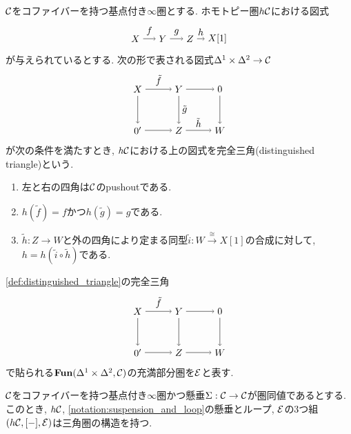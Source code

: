 \documentclass[uplatex, a4paper, 14Q, dvipdfmx]{jsarticle}
\begin{document}
\begin{definition}[完全三角] \label{def:distinguished_triangle}
  $\mathcal{C}$をコファイバーを持つ基点付き$\infty$圏とする.
  ホモトピー圏$h\mathcal{C}$における図式
  \[
    \begin{tikzpicture}[auto,->]
      \node (X) at (0,0) {$X$};
      \node (Y) at (1,0) {$Y$};
      \node (Z) at (2,0) {$Z$};
      \node (X[1]) at (3,0) {$X[1]$};
      \draw (X) -- node {$f$} (Y);
      \draw (Y) -- node {$g$} (Z);
      \draw (Z) -- node {$h$} (X[1]);
    \end{tikzpicture}
  \]
  が与えられているとする.
  次の形で表される図式$\Delta^1 \times \Delta^2 \to \mathcal{C}$
  \[
    \begin{tikzpicture}[auto,->]
      \node (0') at (0,0) {$0'$};
      \node (Z) at (1.5,0) {$Z$};
      \node (W) at (3,0) {$W$};
      \node (X) at (0,1.5) {$X$};
      \node (Y) at (1.5,1.5) {$Y$};
      \node (0) at (3.0,1.5) {$0$};
      \draw (X) -- node {$\tilde{f}$} (Y);
      \draw (Y) -- node {$\tilde{g}$} (Z);
      \draw (Z) -- node {$\tilde{h}$} (W);
      \draw (Y) -- (0);
      \draw (X) -- (0');
      \draw (0') -- (Z);
      \draw (0) -- (W);
    \end{tikzpicture}
  \]
  が次の条件を満たすとき, $h\mathcal{C}$における上の図式を完全三角(distinguished triangle)という. 
  \begin{enumerate}
    \item 左と右の四角は$\mathcal{C}$のpushoutである. 
    \item $h(\tilde{f}) = f$かつ$h(\tilde{g}) = g$である.
    \item $\tilde{h} : Z \to W$と外の四角により定まる同型$\tilde{i} :W \xrightarrow{\cong} X[1]$の合成に対して, $h = h(\tilde{i} \circ \tilde{h})$である. 
  \end{enumerate}
\end{definition}

\cref{def:distinguished_triangle}の完全三角
\[
  \begin{tikzpicture}[auto,->]
    \node (0') at (0,0) {$0'$};
    \node (Z) at (1.5,0) {$Z$};
    \node (W) at (3,0) {$W$};
    \node (X) at (0,1.5) {$X$};
    \node (Y) at (1.5,1.5) {$Y$};
    \node (0) at (3.0,1.5) {$0$};
    \draw (X) -- node {$\tilde{f}$} (Y);
    \draw (Y) -- (Z);
    \draw (Z) -- (W);
    \draw (Y) -- (0);
    \draw (X) -- (0');
    \draw (0') -- (Z);
    \draw (0) -- (W);
  \end{tikzpicture}
\]
で貼られる$\mathbf{Fun}(\Delta^1 \times \Delta^2,\mathcal{C})$の充満部分圏を$\mathcal{E}$と表す. 

\begin{proposition} \label{prop:homotopy_of_stable_is_triangulated}
  $\mathcal{C}$をコファイバーを持つ基点付き$\infty$圏かつ懸垂$\Sigma : \mathcal{C} \to \mathcal{C}$が圏同値であるとする. 
  このとき, $h\mathcal{C}$, \cref{notation:suspension_and_loop}の懸垂とループ, $\mathcal{E}$の3つ組$(h\mathcal{C},[-],\mathcal{E})$は三角圏の構造を持つ.
\end{proposition}
\end{document}
